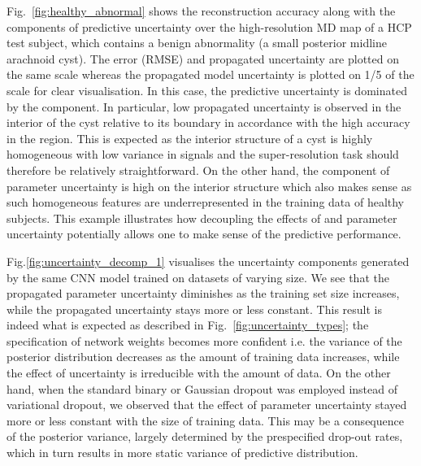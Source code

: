 Fig.~\ref{fig:healthy_abnormal} shows the reconstruction accuracy along with the components of predictive uncertainty over the high-resolution MD map of a HCP test subject, which contains a benign abnormality (a small posterior midline arachnoid cyst). The error (RMSE) and propagated  uncertainty are plotted on the same scale whereas the propagated model uncertainty is plotted on 1/5 of the scale for clear visualisation. In this case, the predictive uncertainty is dominated by the  component. In particular, low propagated  uncertainty is observed in the interior of the cyst relative to its boundary in accordance with the high accuracy in the region. This is expected as the interior structure of a cyst is highly homogeneous with low variance in signals and the super-resolution task should therefore be relatively straightforward. On the other hand, the component of parameter uncertainty is high on the interior structure which also makes sense as such homogeneous features are underrepresented in the  training data of healthy subjects. This example illustrates how decoupling the effects of  and parameter uncertainty potentially allows one to make sense of the predictive performance. 

Fig.\ref{fig:uncertainty_decomp_1} visualises the uncertainty components generated by the same CNN model trained on datasets of varying size. We see that the propagated parameter uncertainty diminishes as the training set size increases, while the propagated  uncertainty stays more or less constant. This result is indeed what is expected as described in Fig.~\ref{fig:uncertainty_types}; the specification of network weights becomes more confident i.e. the variance of the posterior distribution decreases as the amount of training data increases, while the effect of  uncertainty is irreducible with the amount of data.  On the other hand, when the standard binary or Gaussian dropout was employed instead of variational dropout, we observed that the effect of parameter uncertainty stayed more or less constant with the size of training data. This may be a consequence of the posterior variance, largely determined by the prespecified drop-out rates, which in turn results in more static variance of predictive distribution. 

